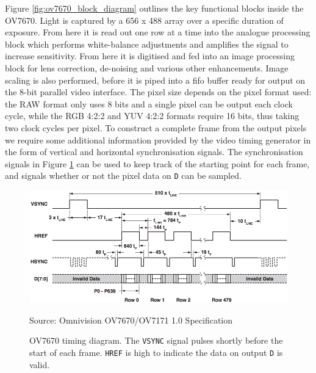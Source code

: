 Figure \ref{fig:ov7670_block_diagram} outlines the key functional blocks inside the OV7670. Light is captured by a 656 x 488 array over a specific duration of exposure. From here it is read out one row at a time into the analogue processing block which performs white-balance adjustments and amplifies the signal to increase sensitivity. From here it is digitised and fed into an image processing block for lens correction, de-noising and various other enhancements. Image scaling is also performed, before it is piped into a \gls{fifo} buffer ready for output on the 8-bit parallel video interface. The pixel size depends on the pixel format used: the RAW format only uses 8 bits and a single pixel can be output each clock cycle, while the RGB 4:2:2 and YUV 4:2:2 formats require 16 bits, thus taking two clock cycles per pixel. To construct a complete frame from the output pixels we require some additional information provided by the video timing generator in the form of vertical and horizontal synchronisation signals. The synchronisation signals in Figure \ref{fig:ov7670_timing} can be used to keep track of the starting point for each frame, and signals whether or not the pixel data on \texttt{D} can be sampled. 

\begin{figure}
  \centering
  \includegraphics[width=1\textwidth]{./img/ov7670_timing.png}\par
Source: Omnivision OV7670/OV7171 1.0 Specification
  \caption{OV7670 timing diagram. The \texttt{VSYNC} signal pulses shortly before the start of each frame. \texttt{HREF} is high to indicate the data on output \texttt{D} is valid.}
  \label{fig:ov7670_timing}
\end{figure}

